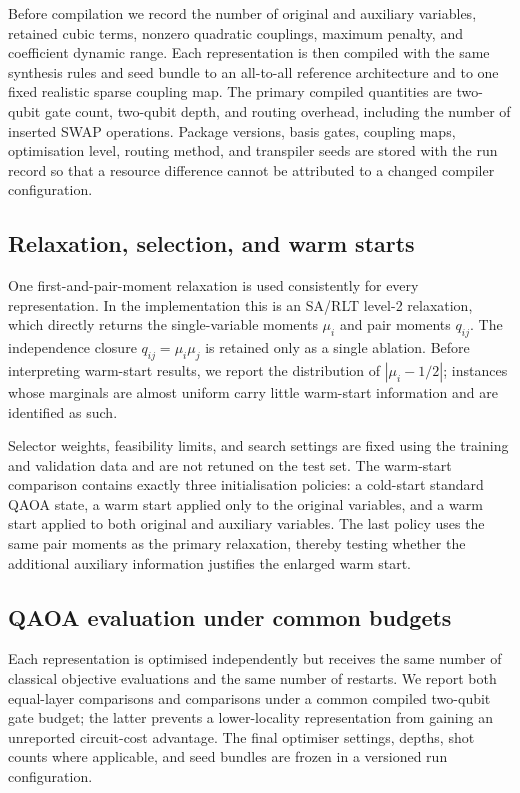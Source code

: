 \documentclass[a4paper,onecolumn,11pt,unpublished]{quantumarticle}
\theoremstyle{remark}
\begin{document}
Before compilation we record the number of original and auxiliary variables,
retained cubic terms, nonzero quadratic couplings, maximum penalty, and
coefficient dynamic range.  Each representation is then compiled with the same
synthesis rules and seed bundle to an all-to-all reference architecture and to
one fixed realistic sparse coupling map.  The primary compiled quantities are
two-qubit gate count, two-qubit depth, and routing overhead, including the
number of inserted SWAP operations.  Package versions, basis gates, coupling
maps, optimisation level, routing method, and transpiler seeds are stored with
the run record so that a resource difference cannot be attributed to a changed
compiler configuration.

\subsection{Relaxation, selection, and warm starts}
\label{sec:experimental-relaxation}

One first-and-pair-moment relaxation is used consistently for every
representation.  In the implementation this is an SA/RLT level-2 relaxation,
which directly returns the single-variable moments $\mu_i$ and pair moments
$q_{ij}$.  The independence closure $q_{ij}=\mu_i\mu_j$ is retained only as a
single ablation.  Before interpreting warm-start results, we report the
distribution of $|\mu_i-1/2|$; instances whose marginals are almost uniform
carry little warm-start information and are identified as such.

Selector weights, feasibility limits, and search settings are fixed using the
training and validation data and are not retuned on the test set.  The warm-start
comparison contains exactly three initialisation policies: a cold-start
standard QAOA state, a warm start applied only to the original variables, and a
warm start applied to both original and auxiliary variables.  The last policy
uses the same pair moments as the primary relaxation, thereby testing whether
the additional auxiliary information justifies the enlarged warm start.

\subsection{QAOA evaluation under common budgets}
\label{sec:qaoa-evaluation}

Each representation is optimised independently but receives the same number of
classical objective evaluations and the same number of restarts.  We report
both equal-layer comparisons and comparisons under a common compiled two-qubit
gate budget; the latter prevents a lower-locality representation from gaining
an unreported circuit-cost advantage.  The final optimiser settings, depths,
shot counts where applicable, and seed bundles are frozen in a versioned run
configuration.
\end{document}
